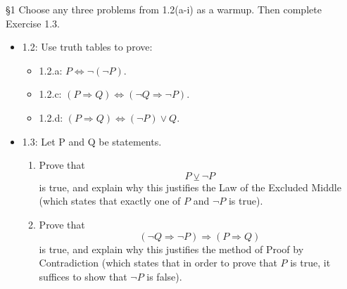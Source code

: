 \documentclass{homework}
\begin{document}
\begin{problem}{\S 1}
  Choose any three problems from 1.2(a-i) as a warmup. Then complete Exercise 1.3. \\
  \begin{itemize}
    \item 1.2: Use truth tables to prove:
    \begin{itemize}
      \item 1.2.a: $P \iff \neg(\neg P)$.
      \item 1.2.c: $\left( P\Rightarrow Q \right) \iff\left( \neg Q\Rightarrow \neg P
        \right)$.
      \item 1.2.d: $\left( P\Rightarrow Q \right) \iff\left( \neg P \right) \lor Q $.
    \end{itemize}
    \item 1.3: Let P and Q be statements.
      \begin{enumerate}[label=(\alph*)]
        \item Prove that \[
        P \veebar \neg P
      \] is true, and explain why this justifies the Law of the Excluded Middle (which states that
      exactly one of $P$ and $\neg P$ is true).
        \item Prove that \[
            \left( \neg Q\Rightarrow \neg P \right) \Rightarrow \left( P\Rightarrow Q \right)
          \] is true, and explain why this justifies the method of Proof by Contradiction (which
          states that in order to prove that $P$ is true, it suffices to show that $\neg P$ is
          false).
      \end{enumerate}
  \end{itemize}
\end{problem}
\end{document}
